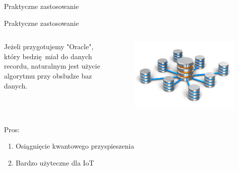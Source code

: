 \documentclass{beamer}
\begin{document}
	\begin{frame}{Praktyczne zastosowanie}
		
	\end{frame}
	
	\begin{frame}{Praktyczne zastosowanie}
			
			\begin{columns}
				\begin{column}{0.5\textwidth}
					\begin{center}
						\begin{block}{}
							Jeżeli przygotujemy "Oracle", który bedzię miał do danych recordu, naturalnym jest użycie algorytmu przy obsłudze baz danych.
						\end{block}
					\end{center}	
				\end{column}
				
				\begin{column}{0.5\textwidth}
					\begin{center}
						\begin{figure}[hbt!]
							
							\includegraphics[scale=0.06]{media/databases.png}
						\end{figure}					
					\end{center}	
				\end{column}
			\end{columns}
			
			\begin{columns}
				\begin{column}{0.5\textwidth}
					\begin{center}
						Pros:\\
						\begin{enumerate}
							\item Osiągnięcie kwantowego przyspieszenia
							\item Bardzo użyteczne dla IoT
						\end{enumerate}	
					\end{center}	
				\end{column}
				

\end{columns}
\end{frame}
\end{document}
